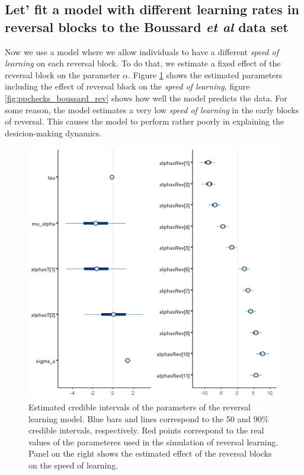 \documentclass[
]{article}
\begin{document}
\hypertarget{let-fit-a-model-with-different-learning-rates-in-reversal-blocks-to-the-boussard-et-al-data-set}{%
\subsection{\texorpdfstring{Let' fit a model with different learning
rates in reversal blocks to the Boussard \emph{et al} data
set}{Let' fit a model with different learning rates in reversal blocks to the Boussard et al data set}}\label{let-fit-a-model-with-different-learning-rates-in-reversal-blocks-to-the-boussard-et-al-data-set}}

Now we use a model where we allow individuals to have a different
\emph{speed of learning} on each reversal block. To do that, we estimate
a fixed effect of the reversal block on the parameter \(\alpha\). Figure
\ref{fig:interv_rev} shows the estimated parameters including the effect
of reversal block on the \emph{speed of learning}, figure
\ref{fig:ppchecks_boussard_rev} shows how well the model predicts the
data. For some reason, the model estimates a very low \emph{speed of
learning} in the early blocks of reversal. This causes the model to
perform rather poorly in explaining the desicion-making dynamics.

\begin{figure}

\includegraphics{boussard_mcmc_interv_rev} \hfill{}

\caption{Estimated credible intervals of the parameters of the reversal learning model. Blue bars and lines correspond to the 50 and 90\% credible intervals, respectively. Red points correspond to the real values of the parameteres used in the simulation of reversal learning. Panel on the right shows the estimated effect of the reversal blocks on the speed of learning.}\label{fig:interv_rev}
\end{figure}
\end{document}
